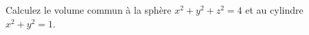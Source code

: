 
\begin{exercice}\label{exoIntMult0007}

Calculez le volume commun à la sphère $x^2+y^2+z^2=4$ et au cylindre $x^2 +y^2=1$.

\end{exercice}
